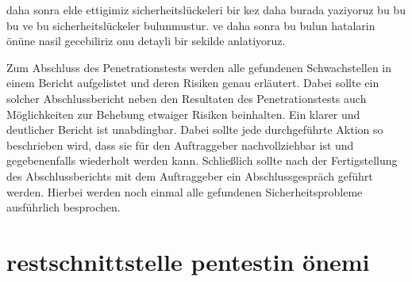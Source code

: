 daha sonra elde ettigimiz sicherheitslückeleri bir kez daha burada yaziyoruz bu bu bu ve bu sicherheitslückeler bulunmustur. ve daha sonra bu bulun hatalarin önüne nasil gecebiliriz onu detayli bir sekilde anlatiyoruz.

Zum Abschluss des Penetrationstests werden alle gefundenen Schwachstellen in einem Bericht aufgelistet und deren Risiken genau erläutert. Dabei sollte ein solcher Abschlussbericht neben den Resultaten des Penetrationstests auch Möglichkeiten zur Behebung etwaiger Risiken beinhalten. Ein klarer und deutlicher Bericht ist unabdingbar. Dabei sollte jede durchgeführte Aktion so beschrieben wird, dass sie für den Auftraggeber nachvollziehbar ist und gegebenenfalls wiederholt werden kann. Schließlich sollte nach der Fertigstellung des Abschlussberichts mit dem Auftraggeber ein Abschlussgespräch geführt werden. Hierbei werden noch einmal alle gefundenen Sicherheitsprobleme ausführlich besprochen.

\section{restschnittstelle pentestin önemi}